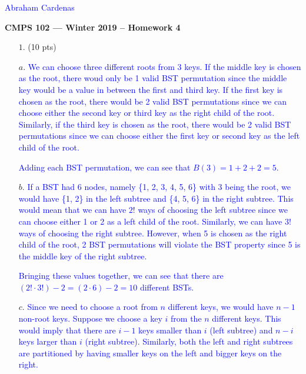 \documentclass[11pt]{article}
\begin{document}
\textcolor{blue}{\hfill Abraham Cardenas} 


\begin{center}
{\bf\Large CMPS 102 --- Winter 2019 --  Homework 4}
\end{center}

\begin{itemize}

\item[$1.$] (10 pts)
\item[$a.$] 
\textcolor{blue}{
We can choose three different roots from 3 keys. If the middle key is chosen as the root, there woud only be 1 valid BST permutation since the middle key would be a value in between the first and third key. If the first key is chosen as the root, there would be 2 valid BST permutations since we can choose either the second key or third key as the right child of the root. Similarly, if the third key is chosen as the root, there would be 2 valid BST permutations since we can choose either the first key or second key as the left child of the root. 
}

\textcolor{blue}{
Adding each BST permutation, we can see that $B(3) = 1 + 2 + 2 = 5$.
}
\item[$b.$]
\textcolor{blue}{
If a BST had 6 nodes, namely \{1, 2, 3, 4, 5, 6\} with 3 being the root, we would have \{1, 2\} in the left subtree and \{4, 5, 6\} in the right subtree. This would mean that we can have $2!$ ways of choosing the left subtree since we can choose either 1 or 2 as a left child of the root. Similarly, we can have $3!$ ways of choosing the right subtree. However, when 5 is chosen as the right child of the root, 2 BST permutations will violate the BST property since 5 is the middle key of the right subtree.
}

\textcolor{blue}{
Bringing these values together, we can see that there are $(2! \cdot 3!) - 2= (2 \cdot 6) - 2 = 10$ different BSTs. 
}
\item[$c.$]
\textcolor{blue}{
Since we need to choose a root from $n$ different keys, we would have $n-1$ non-root keys. Suppose we choose a key $i$ from the $n$ different keys. This would imply that there are $i-1$ keys smaller than $i$ (left subtree) and $n-i$ keys larger than $i$ (right subtree). Similarly, both the left and right subtrees are partitioned by having smaller keys on the left and bigger keys on the right.\\
}


\end{itemize}
\end{document}
